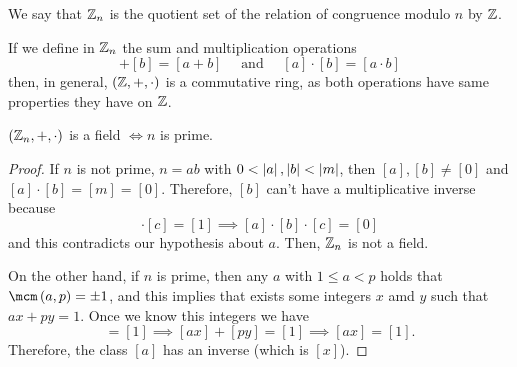 
\begin{defi}
    We say that $\mathbb{Z}_n$ is the quotient set of the relation of congruence modulo $n$ by $\mathbb{Z}$.
\end{defi}

\begin{prop}
    If we define in $\mathbb{Z}_n$ the sum and multiplication operations
    \begin{equation}
        [a] + [b] = [a + b]\quad\textrm{ and }\quad[a]\cdot[b] = [a\cdot b]
    \end{equation}
    then, in general, $\left( \mathbb{Z}, +, \cdot \right)$ is a commutative ring, as both operations have same properties they
    have on $\mathbb{Z}$.
\end{prop}


\begin{prop} \label{3:zn-field-condition}
    $\left( \mathbb{Z}_n, +, \cdot \right) $ is a field $\iff n$ is prime.
\end{prop}

\begin{proof}
    If $n$ is not prime, $n = ab$ with $0 < \left\vert a \right\vert, \left\vert b \right\vert < \left\vert m \right\vert$, then $[a], [b]\neq [0]$ and
    $[a]\cdot[b] = [m] = [0]$. Therefore, $[b]$ can't have a multiplicative inverse because
    \begin{equation}
        [b]\cdot[c] = [1] \implies [a]\cdot[b]\cdot[c] = [0]
    \end{equation}
    and this contradicts our hypothesis about $a$. Then, $\mathbb{Z}_n$ is not a field.

    On the other hand, if $n$ is prime, then any $a$ with $1 \leq a < p$ holds that $\mcm\left( a, p \right)
    = \pm 1$, and this implies that exists some integers $x$ amd $y$ such that $ax + py = 1$. Once we know
    this integers we have
    \begin{equation}
        [ax + py] = [1]\implies [ax] + [py] = [1]\implies [ax] = [1].
    \end{equation}
    Therefore, the class $[a]$ has an inverse (which is $[x]$).
\end{proof}

